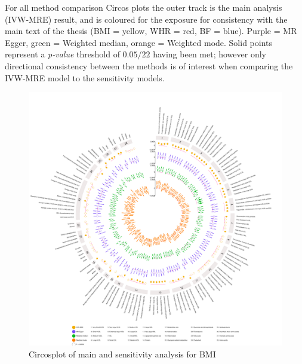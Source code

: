 \documentclass[11pt,twoside]{bristolthesis}
\begin{document}
For all method comparison Circos plots the outer track is the main analysis (IVW-MRE) result, and is coloured for the exposure for consistency with the main text of the thesis (BMI = yellow, WHR = red, BF = blue). Purple = MR Egger, green = Weighted median, orange = Weighted mode. Solid points represent a \emph{p-value} threshold of \(0.05/22\) having been met; however only directional consistency between the methods is of interest when comparing the IVW-MRE model to the sensitivity models.
\begin{figure}
\includegraphics[width=1\linewidth]{data/chapter5/figures/sensitivity_analysis_BMI} \caption{Circosplot of main and sensitivity analysis for BMI}\label{fig:appendix-chapter5-figure-circosplot-sensitivity-main-BMI}
\end{figure}
\end{document}
